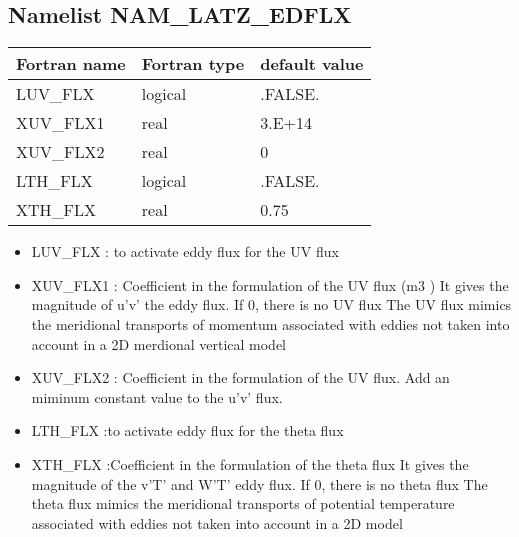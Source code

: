 \subsection{Namelist NAM\_LATZ\_EDFLX}
  \begin{center}
  \begin{tabular}{|l|l|l|}
    \hline
    Fortran name & Fortran type & default value \\
    \hline
     LUV\_FLX  & logical   & .FALSE. \\
     XUV\_FLX1 & real      &  3.E+14 \\
     XUV\_FLX2 & real      &  0      \\
     LTH\_FLX  & logical   & .FALSE. \\
     XTH\_FLX  & real      &  0.75   \\

    \hline
  \end{tabular}
  \end{center}
\begin{itemize}
  \item LUV\_FLX  : to activate eddy flux for the UV flux
  \item XUV\_FLX1 : Coefficient in the formulation of the UV flux (m3 )
                                                  It gives the magnitude of u'v' the eddy flux.
                                                If 0, there is no UV flux
                                                The UV flux mimics the meridional transports of momentum associated with eddies
                                                    not taken into account in a 2D  merdional vertical model
  \item XUV\_FLX2 : Coefficient in the formulation of the UV flux. 
                                                Add an miminum constant value to the u'v' flux. 

  \item LTH\_FLX :to activate eddy flux for the theta flux
  \item XTH\_FLX :Coefficient in the formulation of the theta flux 
                                                It gives the magnitude of the v'T' and W'T' eddy flux.
                                                If 0, there is no theta flux
                                                The theta flux mimics the meridional transports of potential temperature 
                                                    associated with eddies not taken into account in a 2D model 

\end{itemize}

